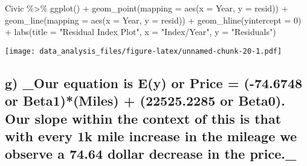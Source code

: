 \documentclass[
]{article}
\newenvironment{Shaded}{\begin{snugshade}}{\end{snugshade}}
\newcommand{\AttributeTok}[1]{\textcolor[rgb]{0.77,0.63,0.00}{#1}}
\newcommand{\DecValTok}[1]{\textcolor[rgb]{0.00,0.00,0.81}{#1}}
\newcommand{\FunctionTok}[1]{\textcolor[rgb]{0.00,0.00,0.00}{#1}}
\newcommand{\NormalTok}[1]{#1}
\newcommand{\SpecialCharTok}[1]{\textcolor[rgb]{0.00,0.00,0.00}{#1}}
\newcommand{\StringTok}[1]{\textcolor[rgb]{0.31,0.60,0.02}{#1}}
\begin{document}
\begin{Shaded}
\begin{Highlighting}[]
\NormalTok{Civic }\SpecialCharTok{\%\textgreater{}\%}
  \FunctionTok{ggplot}\NormalTok{() }\SpecialCharTok{+}
  \FunctionTok{geom\_point}\NormalTok{(}\AttributeTok{mapping =} \FunctionTok{aes}\NormalTok{(}\AttributeTok{x =}\NormalTok{ Year, }\AttributeTok{y =}\NormalTok{ resid)) }\SpecialCharTok{+}
  \FunctionTok{geom\_line}\NormalTok{(}\AttributeTok{mapping =} \FunctionTok{aes}\NormalTok{(}\AttributeTok{x =}\NormalTok{ Year, }\AttributeTok{y =}\NormalTok{ resid)) }\SpecialCharTok{+}
  \FunctionTok{geom\_hline}\NormalTok{(}\AttributeTok{yintercept =} \DecValTok{0}\NormalTok{) }\SpecialCharTok{+}
  \FunctionTok{labs}\NormalTok{(}\AttributeTok{title =} \StringTok{"Residual Index Plot"}\NormalTok{,}
       \AttributeTok{x =} \StringTok{"Index/Year"}\NormalTok{,}
       \AttributeTok{y =} \StringTok{"Residuals"}\NormalTok{)}
\end{Highlighting}
\end{Shaded}

\texttt{[image: data\_analysis\_files/figure-latex/unnamed-chunk-20-1.pdf]}

\hypertarget{g-_our-equation-is-ey-or-price--74.6748-or-beta1miles-22525.2285-or-beta0.-our-slope-within-the-context-of-this-is-that-with-every-1k-mile-increase-in-the-mileage-we-observe-a-74.64-dollar-decrease-in-the-price._}{%
\subsection{g) \_Our equation is E(y) or Price = (-74.6748 or
Beta1)*(Miles) + (22525.2285 or Beta0). Our slope within the context of
this is that with every 1k mile increase in the mileage we observe a
74.64 dollar decrease in the
price.\_}\label{g-_our-equation-is-ey-or-price--74.6748-or-beta1miles-22525.2285-or-beta0.-our-slope-within-the-context-of-this-is-that-with-every-1k-mile-increase-in-the-mileage-we-observe-a-74.64-dollar-decrease-in-the-price._}}
\end{document}
